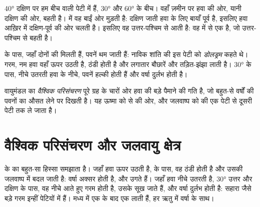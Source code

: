 \begin{example}\label{ex:g8:winds-global-circulation:40s}
\ang{40} दक्षिण पर हम बीच वाली पेटी में हैं, \ang{30} और \ang{60} के बीच। वहाँ
ज़मीन पर हवा  की ओर, यानी दक्षिण की ओर, बहती है।  में वह बाईं ओर
मुड़ती है: दक्षिण जाती हवा के लिए बायाँ पूर्व है, इसलिए हवा आख़िर में दक्षिण-पूर्व की
ओर चलती है। इसलिए वह उत्तर-पश्चिम से आती है: वह  में से एक है, जो
उत्तर-पश्चिम से बहती
है।
\end{example}

 के पास, जहाँ दोनों  की  मिलती हैं, पवनें थम जाती
हैं: नाविक शांति की इस पेटी को \emph{डोलड्रम} कहते थे। गरम, नम हवा वहाँ ऊपर उठती
है, ठंडी होती है और लगातार बौछारें और तड़ित-झंझा लाती है। \ang{30} के पास, नीचे उतरती
हवा के नीचे, पवनें हल्की होती हैं और वर्षा दुर्लभ होती
है।

\begin{definition}[वायुमंडल का वैश्विक परिसंचरण]\label{def:g8:winds-global-circulation:circulation}
वायुमंडल का \emph{वैश्विक परिसंचरण} पूरे ग्रह के चारों ओर
हवा की बड़े पैमाने की गति है, जो बहुत-से वर्षों की पवनों का औसत लेने पर दिखती है। यह
ऊष्मा को  से  की ओर, और जलवाष्प को  की एक पेटी से दूसरी
पेटी तक ले जाता
है।
\end{definition}

\section{वैश्विक परिसंचरण और जलवायु क्षेत्र}

  के  का बहुत-सा हिस्सा समझाता है। जहाँ हवा ऊपर उठती है,
 के पास, वह ठंडी होती है और उसकी जलवाष्प  में बदल जाती है: वर्षा
अक्सर होती है, और  उगते हैं। जहाँ हवा नीचे उतरती है, \ang{30} उत्तर और
दक्षिण के पास, वह नीचे आते हुए गरम होती है, उसके  सूख जाते हैं, और वर्षा दुर्लभ
होती है: सहारा जैसे बड़े गरम  इन्हीं पेटियों में हैं। मध्य  में  एक के बाद एक  लाती हैं, हर ऋतु में वर्षा के
साथ।

